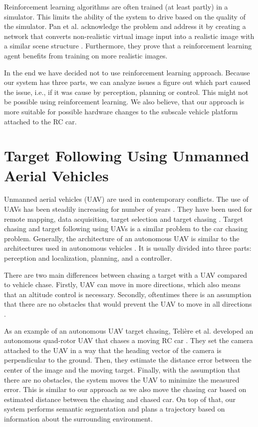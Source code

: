 \documentclass{ctuthesis/ctuthesis}
\begin{document}
Reinforcement learning algorithms are often trained (at least partly) in a simulator. This limits the ability of the system to drive based on the quality of the simulator. Pan et al. acknowledge the problem and address it by creating a network that converts non-realistic virtual image input into a realistic image with a similar scene structure \cite{synthetic_images}. Furthermore, they prove that a reinforcement learning agent benefits from training on more realistic images.\par


In the end we have decided not to use reinforcement learning approach. Because our system has three parts, we can analyze issues a figure out which part caused the issue, i.e., if it was cause by perception, planning or control. This might not be possible using reinforcement learning. We also believe, that our approach is more suitable for possible hardware changes to the subscale vehicle platform attached to the RC car. 





\section{Target Following Using Unmanned Aerial Vehicles}
Unmanned aerial vehicles (UAV) are used in contemporary conflicts. The use of UAVs has been steadily increasing for number of years \cite{UAV_good_or_bad}. They have been used for remote mapping, data acquisition, target selection and target chasing \cite{UAV_good_or_bad,UAV_use}. Target chasing and target following using UAVs is a similar problem to the car chasing problem. Generally, the architecture of an autonomous UAV is similar to the architectures used in autonomous vehicles \cite{target_following_alg,uva_tracking_formula}. It is usually divided into three parts: perception and localization, planning, and a controller. \par

There are two main differences between chasing a target with a UAV compared to vehicle chase. Firstly, UAV can move in more directions, which also means that an altitude control is necessary. Secondly, oftentimes there is an assumption that there are no obstacles that would prevent the UAV to move in all directions \cite{target_following_alg,uva_tracking_formula,rotorcraft}. \par


As an example of an autonomous UAV target chasing, Telière et al. developed an autonomous quad-rotor UAV that chases a moving RC car \cite{uva_tracking_formula}. They set the camera attached to the UAV in a way that the heading vector of the camera is perpendicular to the ground. Then, they estimate the distance error between the center of the image and the moving target. Finally, with the assumption that there are no obstacles, the system moves the UAV to minimize the measured error. This is similar to our approach as we also move the chasing car based on estimated distance between the chasing and chased car. On top of that, our system performs semantic segmentation and plans a trajectory based on information about the surrounding environment. 
\end{document}
